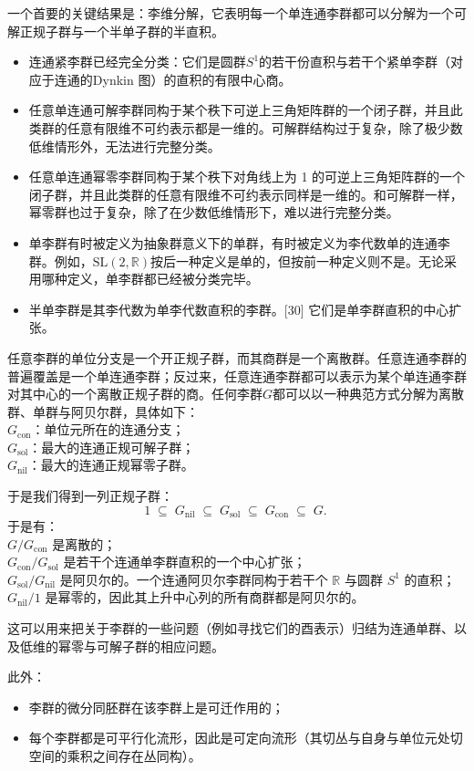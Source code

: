 一个首要的关键结果是：李维分解，它表明每一个单连通李群都可以分解为一个可解正规子群与一个半单子群的半直积。
\begin{itemize}
\item 连通紧李群已经完全分类：它们是圆群$S^1$的若干份直积与若干个紧单李群（对应于连通的Dynkin 图）的直积的有限中心商。
\item 任意单连通可解李群同构于某个秩下可逆上三角矩阵群的一个闭子群，并且此类群的任意有限维不可约表示都是一维的。可解群结构过于复杂，除了极少数低维情形外，无法进行完整分类。
\item 任意单连通幂零李群同构于某个秩下对角线上为 1 的可逆上三角矩阵群的一个闭子群，并且此类群的任意有限维不可约表示同样是一维的。和可解群一样，幂零群也过于复杂，除了在少数低维情形下，难以进行完整分类。
\item 单李群有时被定义为抽象群意义下的单群，有时被定义为李代数单的连通李群。例如，$\mathrm{SL}(2,\mathbb{R})$按后一种定义是单的，但按前一种定义则不是。无论采用哪种定义，单李群都已经被分类完毕。
\item 半单李群是其李代数为单李代数直积的李群。[30] 它们是单李群直积的中心扩张。
\end{itemize}
任意李群的单位分支是一个开正规子群，而其商群是一个离散群。任意连通李群的普遍覆盖是一个单连通李群；反过来，任意连通李群都可以表示为某个单连通李群对其中心的一个离散正规子群的商。任何李群$G$都可以以一种典范方式分解为离散群、单群与阿贝尔群，具体如下：\\
$G_{\mathrm{con}}$：单位元所在的连通分支；\\
$G_{\mathrm{sol}}$：最大的连通正规可解子群；\\
$G_{\mathrm{nil}}$：最大的连通正规幂零子群。

于是我们得到一列正规子群：
$$
1 \;\subseteq\; G_{\mathrm{nil}} \;\subseteq\; G_{\mathrm{sol}} \;\subseteq\; G_{\mathrm{con}} \;\subseteq\; G.~
$$
于是有：\\
$G / G_{\mathrm{con}}$ 是离散的；\\
$G_{\mathrm{con}} / G_{\mathrm{sol}}$ 是若干个连通单李群直积的一个中心扩张；\\
$G_{\mathrm{sol}} / G_{\mathrm{nil}}$ 是阿贝尔的。一个连通阿贝尔李群同构于若干个 $\mathbb{R}$ 与圆群 $S^1$ 的直积；\\
$G_{\mathrm{nil}} / 1$ 是幂零的，因此其上升中心列的所有商群都是阿贝尔的。

这可以用来把关于李群的一些问题（例如寻找它们的酉表示）归结为连通单群、以及低维的幂零与可解子群的相应问题。

此外：
\begin{itemize}
\item 李群的微分同胚群在该李群上是可迁作用的；
\item 每个李群都是可平行化流形，因此是可定向流形（其切丛与自身与单位元处切空间的乘积之间存在丛同构）。
\end{itemize}
